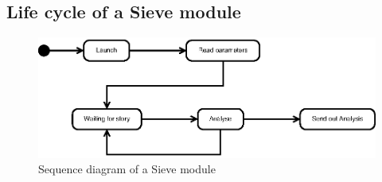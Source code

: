 \subsection{Life cycle of a Sieve module}

\begin{figure}[htp]
  \centering
  \includegraphics{image/sequence-diagram-sieve}
  \caption{Sequence diagram of a Sieve module}
\end{figure}
